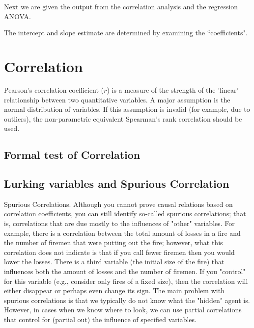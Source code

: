 \documentclass[a4paper,12pt]{article}
\begin{document}
Next we are given the output from the correlation analysis and the regression ANOVA.


The intercept and slope estimate are determined by examining the ``coefficients".












\section{Correlation}

Pearson's correlation coefficient ($r$) is a measure of the strength of the 'linear' relationship between two quantitative variables. A major assumption is the normal distribution of variables. If this assumption is invalid (for example, due to outliers), the non-parametric equivalent Spearman's rank correlation should be used.

\subsection{Formal test of Correlation}
\subsection{Lurking variables and Spurious Correlation}
Spurious Correlations. Although you cannot prove causal relations based on correlation coefficients, you can still identify so-called spurious correlations; that is, correlations that are due mostly to the influences of "other" variables. For example, there is a correlation between the total amount of losses in a fire and the number of firemen that were putting out the fire; however, what this correlation does not indicate is that if you call fewer firemen then you would lower the losses. There is a third variable (the initial size of the fire) that influences both the amount of losses and the number of firemen. If you "control" for this variable (e.g., consider only fires of a fixed size), then the correlation will either disappear or perhaps even change its sign. The main problem with spurious correlations is that we typically do not know what the "hidden" agent is. However, in cases when we know where to look, we can use partial correlations that control for (partial out) the influence of specified variables.
\end{document}
